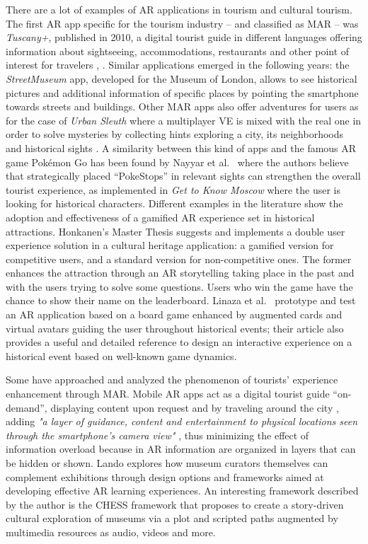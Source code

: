 There are a lot of examples of AR applications in tourism and cultural tourism. The first AR app specific for the tourism industry -- and classified as MAR -- was \textit{Tuscany+}, published in 2010, a digital tourist guide in different languages offering information about sightseeing, accommodations, restaurants and other point of interest for travelers \cite{kounavis_enhancing_2012}, \cite{nayyar_virtual_2018}. Similar applications emerged in the following years: the \textit{StreetMuseum} app, developed for the Museum of London, allows to see historical pictures and additional information of specific places by pointing the smartphone towards streets and buildings. Other MAR apps also offer adventures for users as for the case of \textit{Urban Sleuth} where a multiplayer VE is mixed with the real one in order to solve mysteries by collecting hints exploring a city, its neighborhoods and historical sights \cite{kounavis_enhancing_2012}. A similarity between this kind of apps and the famous AR game Pokémon Go has been found by Nayyar et al.~\cite{nayyar_virtual_2018} where the authors believe that strategically placed “PokeStops” in relevant sights can strengthen the overall tourist experience, as implemented in \textit{Get to Know Moscow} \cite{honkanen_enhancing_2018} where the user is looking for historical characters.
Different examples in the literature show the adoption and effectiveness of a gamified AR experience set in historical attractions. Honkanen's Master Thesis \cite{honkanen_enhancing_2018} suggests and implements a double user experience solution in a cultural heritage application: a gamified version for competitive users, and a standard version for non-competitive ones. The former enhances the attraction through an AR storytelling taking place in the past and with the users trying to solve some questions. Users who win the game have the chance to show their name on the leaderboard. Linaza et al.~\cite{linaza_interactive_2007} prototype and test an AR application based on a board game enhanced by augmented cards and virtual avatars guiding the user throughout historical events; their article also provides a useful and detailed reference to design an interactive experience on a historical event based on well-known game dynamics.

Some have approached and analyzed the phenomenon of tourists' experience enhancement through MAR. Mobile AR apps act as a digital tourist guide “on-demand”, displaying content upon request and by traveling around the city \cite{kounavis_enhancing_2012}, adding \textit{"a layer of guidance, content and entertainment to physical locations seen through the smartphone's camera view"} \cite{nayyar_virtual_2018}, thus minimizing the effect of information overload \cite{kounavis_enhancing_2012} because in AR information are organized in layers that can be hidden or shown. Lando \cite{lando_how_2017} explores how museum curators themselves can complement exhibitions through design options and frameworks aimed at developing effective AR learning experiences. An interesting framework described by the author is the CHESS framework that proposes to create a story-driven cultural exploration of museums via a plot and scripted paths augmented by multimedia resources as audio, videos and more.

